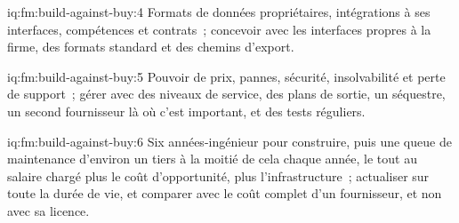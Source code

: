 \begin{solution}{iq:fm:build-against-buy:4}
Formats de données propriétaires, intégrations à ses interfaces, compétences et contrats~; concevoir avec les interfaces propres à la firme, des formats standard et des
chemins d'export.
\end{solution}

\begin{solution}{iq:fm:build-against-buy:5}
Pouvoir de prix, pannes, sécurité, insolvabilité et perte de support~; gérer avec des niveaux de service, des plans de sortie, un séquestre, un second fournisseur là où
c'est important, et des tests réguliers.
\end{solution}

\begin{solution}{iq:fm:build-against-buy:6}
Six années-ingénieur pour construire, puis une queue de maintenance d'environ un tiers à la moitié de cela chaque année, le tout au salaire chargé plus le coût d'opportunité,
plus l'infrastructure~; actualiser sur toute la durée de vie, et comparer avec le coût complet d'un fournisseur, et non avec sa licence.
\end{solution}
